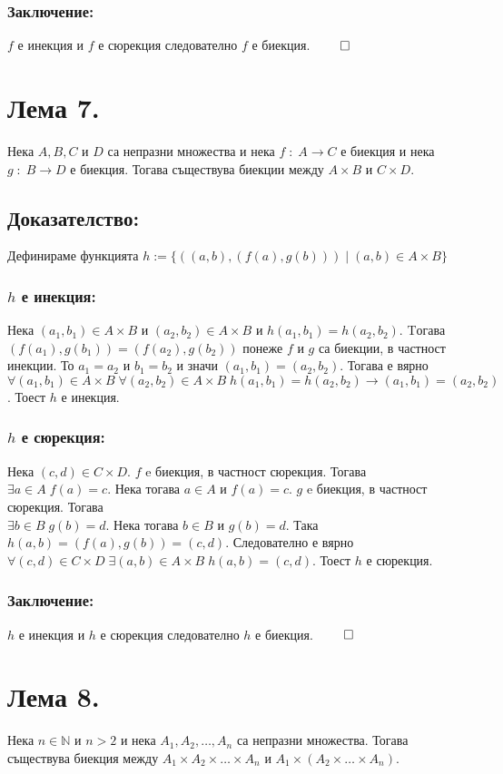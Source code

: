 \documentclass[a4paper, 12pt, oneside]{article}
\newcommand{\N}{\mathbb{N}}
\begin{document}
\subsubsection*{Заключение:}
\(f\) е инекция и \(f\) е сюрекция следователно \(f\) е биекция. \(\qed\)
\section*{Лема 7.}
Нека \(A, B, C\) и \(D\) са непразни множества и
нека \(f \; : \; A \to C\) е биекция и нека \(g \; : \; B \to D\) е биекция.
Тогава съществува биекции между \(A \times B\) и \(C \times D\).
\subsection*{Доказателство:}
Дефинираме функцията \(h := \{((a, b), (f(a), g(b))) \; | \; (a, b) \in A \times B\}\)
\subsubsection*{\(h\) е инекция:}
Нека \((a_1, b_1) \in A \times B\) и \((a_2, b_2) \in A \times B\) и \(h(a_1, b_1) = h(a_2, b_2)\).
Tогава \((f(a_1), g(b_1)) = (f(a_2), g(b_2))\) понеже \(f\) и \(g\) са биекции, в частност инекции.
То \(a_1 = a_2\) и \(b_1 = b_2\) и значи \((a_1, b_1) = (a_2, b_2)\). Тогава е вярно \\
\(\forall (a_1, b_1) \in A \times B \; \forall (a_2, b_2) \in A \times B \; h(a_1, b_1) = h(a_2, b_2) \longrightarrow (a_1, b_1) = (a_2, b_2)\).
Тоест \(h\) е инекция.
\subsubsection*{\(h\) е сюрекция:}
Нека \((c, d) \in C \times D\). \(f\) e биекция, в частност сюрекция.
Тогава \(\exists a \in A \; f(a) = c\). Нека тогава \(a \in A\) и \(f(a) = c\).
\(g\) e биекция, в частност сюрекция. Тогава \\
\(\exists b \in B \; g(b) = d\). Нека тогава \(b \in B\) и \(g(b) = d\).
Така \(h(a, b) = (f(a), g(b)) = (c, d)\).
Следователно е вярно \(\forall (c, d) \in C \times D \; \exists (a, b) \in A \times B \; h(a, b) = (c, d)\).
Тоест \(h\) е сюрекция.
\subsubsection*{Заключение:}
\(h\) е инекция и \(h\) е сюрекция следователно \(h\) е биекция. \(\qed\)
\section*{Лема 8.}
Нека \(n \in \N\) и \(n > 2\) и нека 
\(A_1, A_2, \dots, A_n\) са непразни множества.
Тогава съществува биекция между \(A_1 \times A_2 \times \dots \times A_n\)
и \(A_1 \times (A_2 \times \dots \times A_n)\).
\end{document}
